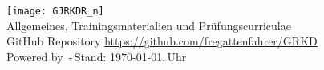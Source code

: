 	\begin{center}
		\texttt{[image: GJRKDR\_n]}\\
		Allgemeines, Trainingsmaterialien und Prüfungscurriculae{\scriptsize \\\textsf{GitHub Repository \href{https://github.com/fregattenfahrer/GRKD}{https://github.com/fregattenfahrer/GRKD}} \\\textsf{Powered by} \LaTeXe \textsf{\,-\,Stand: \today,\,\currenttime Uhr}} 
	\end{center}
	
	